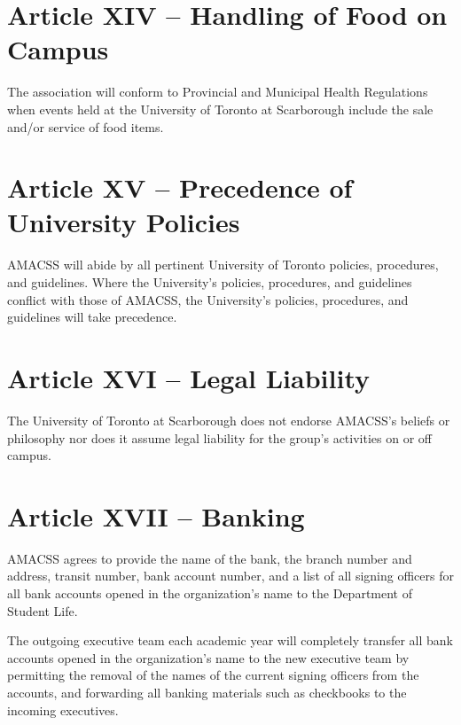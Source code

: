 \documentclass[12pt,a4paper]{article}
\begin{document}
\section{Article XIV – Handling of Food on Campus}

\begin{constitutionlist}
\item The association will conform to Provincial and Municipal Health Regulations when events held at the University of Toronto at Scarborough include the sale and/or service of food items.
\end{constitutionlist}

\section{Article XV – Precedence of University Policies}

\begin{constitutionlist}
\item AMACSS will abide by all pertinent University of Toronto policies, procedures, and guidelines. Where the University's policies, procedures, and guidelines conflict with those of AMACSS, the University's policies, procedures, and guidelines will take precedence.
\end{constitutionlist}

\section{Article XVI – Legal Liability}

\begin{constitutionlist}
\item The University of Toronto at Scarborough does not endorse AMACSS's beliefs or philosophy nor does it assume legal liability for the group's activities on or off campus.
\end{constitutionlist}

\section{Article XVII – Banking}

\begin{constitutionlist}
\item AMACSS agrees to provide the name of the bank, the branch number and address, transit number, bank account number, and a list of all signing officers for all bank accounts opened in the organization's name to the Department of Student Life.

\item The outgoing executive team each academic year will completely transfer all bank accounts opened in the organization's name to the new executive team by permitting the removal of the names of the current signing officers from the accounts, and forwarding all banking materials such as checkbooks to the incoming executives.
\end{constitutionlist}
\end{document}
